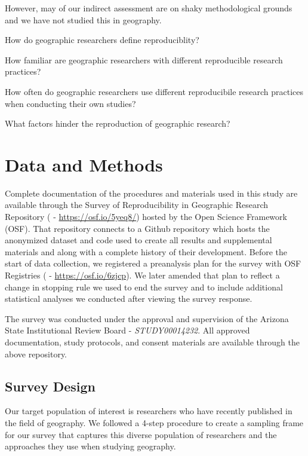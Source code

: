 \documentclass[]{interact}
\theoremstyle{plain}%
\theoremstyle{definition}
\theoremstyle{remark}
\begin{document}
However, may of our indirect assessment are on shaky methodological grounds and we have not studied this in geography. 

\begin{description}
\setlength{\itemindent}{0ex}
    \item[\textbf{(Q1)}] How do geographic researchers define reproduciblity?
    \item[\textbf{(Q2)}] How familiar are geographic researchers with different reproducible research practices?
    \item[\textbf{(Q3)}] How often do geographic researchers use different reproducibile research practices when conducting their own studies? 
    \item[\textbf{(Q4)}] What factors hinder the reproduction of geographic research?
\end{description}


\section*{Data and Methods}
Complete documentation of the procedures and materials used in this study are available through the Survey of Reproducibility in Geographic Research Repository (\citet{Kedron_Holler_Bardin_Hilgendorf_2022} - \url{https://osf.io/5yeq8/}) hosted by the Open Science Framework (OSF).
That repository connects to a Github repository which hosts the anonymized dataset and code used to create all results and supplemental materials and along with a complete history of their development. 
Before the start of data collection, we registered a preanalysis plan for the survey with OSF Registries (\citet{Kedron_Survey_PAP} - \url{https://osf.io/6zjcp}). 
We later amended that plan to reflect a change in stopping rule we used to end the survey and to include additional statistical analyses we conducted after viewing the survey response. 

The survey was conducted under the approval and supervision of the Arizona State Institutional Review Board - \textit{STUDY00014232}.
All approved documentation, study protocols, and consent materials are available through the above repository.

\subsection*{Survey Design}
Our target population of interest is researchers who have recently published in the field of geography. 
We followed a 4-step procedure to create a sampling frame for our survey that captures this diverse population of researchers and the approaches they use when studying geography. 
\end{document}
